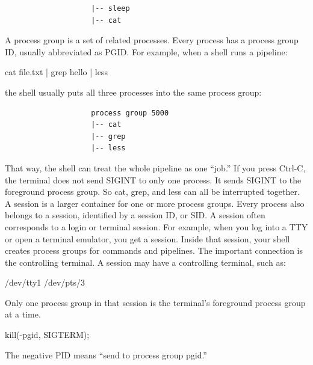 \documentclass{report}
\begin{document}
\begin{itemize}
\begin{verbatim}
                    |-- sleep
                    |-- cat
                \end{verbatim}
                A process group is a set of related processes. Every process has a process group ID, usually abbreviated as PGID.
                \bigbreak \noindent 
                For example, when a shell runs a pipeline:
                \bigbreak \noindent 
                \begin{bashcode}
                cat file.txt | grep hello | less
                \end{bashcode}
                \bigbreak \noindent 
                the shell usually puts all three processes into the same process group:
                \begin{verbatim}
                    process group 5000
                    |-- cat
                    |-- grep
                    |-- less
                \end{verbatim}
                That way, the shell can treat the whole pipeline as one “job.”
                \bigbreak \noindent 
                If you press Ctrl-C, the terminal does not send SIGINT to only one process. It sends SIGINT to the foreground process group. So cat, grep, and less can all be interrupted together.
                \bigbreak \noindent 
                A session is a larger container for one or more process groups. Every process also belongs to a session, identified by a session ID, or SID.
                \bigbreak \noindent 
                A session often corresponds to a login or terminal session. For example, when you log into a TTY or open a terminal emulator, you get a session. Inside that session, your shell creates process groups for commands and pipelines.
                \bigbreak \noindent 
                The important connection is the controlling terminal. A session may have a controlling terminal, such as:
                \bigbreak \noindent 
                \begin{bashcode}
                    /dev/tty1
                    /dev/pts/3
                \end{bashcode}
                \bigbreak \noindent 
                Only one process group in that session is the terminal’s foreground process group at a time.
                \bigbreak \noindent 
                \begin{bashcode}
                kill(-pgid, SIGTERM);
                \end{bashcode}
                \bigbreak \noindent 
                The negative PID means “send to process group pgid.”

\end{itemize}
\end{document}
